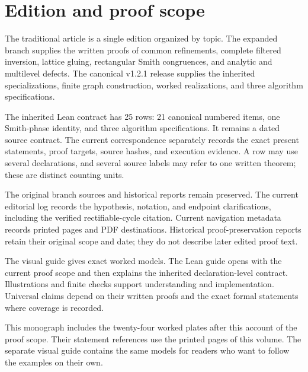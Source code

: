 \section{Edition and proof scope}\label{sec:edition-scope}
The traditional article is a single edition organized by topic. The expanded branch supplies the written proofs of common refinements, complete filtered inversion, lattice gluing, rectangular Smith congruences, and analytic and multilevel defects. The canonical v1.2.1 release supplies the inherited specializations, finite graph construction, worked realizations, and three algorithm specifications.



The inherited Lean contract has 25 rows: 21 canonical numbered items, one Smith-phase identity, and three algorithm specifications. It remains a dated source contract. The current correspondence separately records the exact present statements, proof targets, source hashes, and execution evidence. A row may use several declarations, and several source labels may refer to one written theorem; these are distinct counting units.

The original branch sources and historical reports remain preserved. The current editorial log records the hypothesis, notation, and endpoint clarifications, including the verified rectifiable-cycle citation. Current navigation metadata records printed pages and PDF destinations. Historical proof-preservation reports retain their original scope and date; they do not describe later edited proof text.

The visual guide gives exact worked models. The Lean guide opens with the current proof scope and then explains the inherited declaration-level contract. Illustrations and finite checks support understanding and implementation. Universal claims depend on their written proofs and the exact formal statements where coverage is recorded.

This monograph includes the twenty-four worked plates after this account of the proof scope. Their statement references use the printed pages of this volume. The separate visual guide contains the same models for readers who want to follow the examples on their own.
